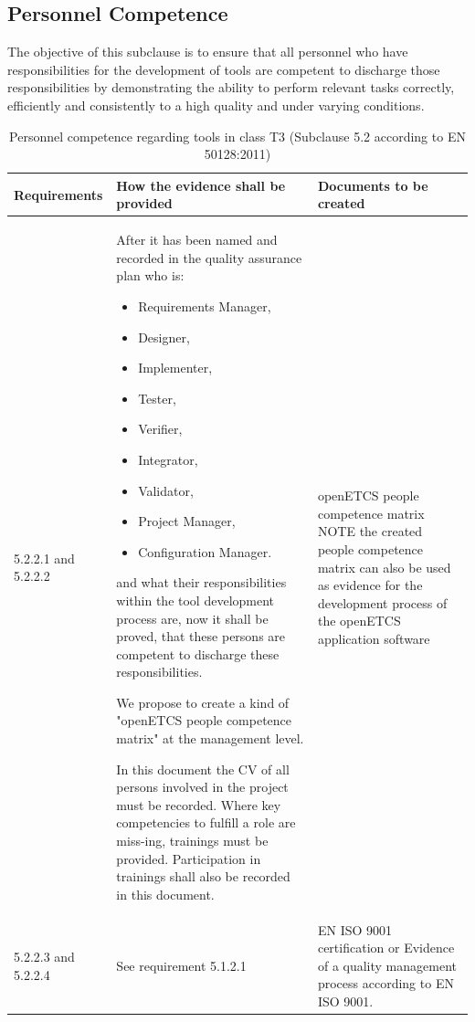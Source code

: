 \documentclass{template/openetcs_report}
\begin{document}
\subsection{Personnel Competence}
\begin{flushleft}
The objective of this subclause is to ensure that all personnel who have responsibilities for the development of tools are competent to discharge those responsibilities by demonstrating the ability to perform relevant tasks correctly, efficiently and consistently to a high quality and under varying conditions.
\end{flushleft}
{\footnotesize\sffamily\centering
\begin{longtable}{|p{2cm}|p{9cm}|p{3cm}|}
\caption{Personnel competence regarding tools in class T3 (Subclause 5.2 according to EN 50128:2011)}\\
\hline
\bfseries Requirements & \bfseries How the evidence shall be provided & \bfseries Documents to be created\\
\hline
\hline
\endhead
\hline
\endfoot

5.2.2.1 and 5.2.2.2 & After it has been named and recorded in the quality assurance plan who is:
\begin{itemize}\itemsep=0pt
  \item Requirements Manager,
  \item Designer,
  \item Implementer,
  \item Tester,
  \item Verifier,
  \item Integrator,
  \item Validator,
  \item Project Manager,
  \item Configuration Manager.
\end{itemize}
and what their responsibilities within the tool development process are, now it shall be proved, that these persons are competent to discharge these responsibilities.

We propose to create a kind of "openETCS people competence matrix" at the management level. 

In this document the CV of all persons involved in the project must be recorded.
Where key competencies to fulfill a role are miss-ing, trainings must be provided.
Participation in trainings shall also be recorded in this document.
& openETCS people competence matrix
\linebreak
\linebreak
NOTE\linebreak
the created people competence matrix can also be used as evidence for the development process of the openETCS application software\\ 
\hline
5.2.2.3 and 5.2.2.4 & See requirement 5.1.2.1 & EN ISO 9001 certification or Evidence of a quality management process according to EN ISO 9001.\\ 
\hline
\end{longtable}}
\end{document}

